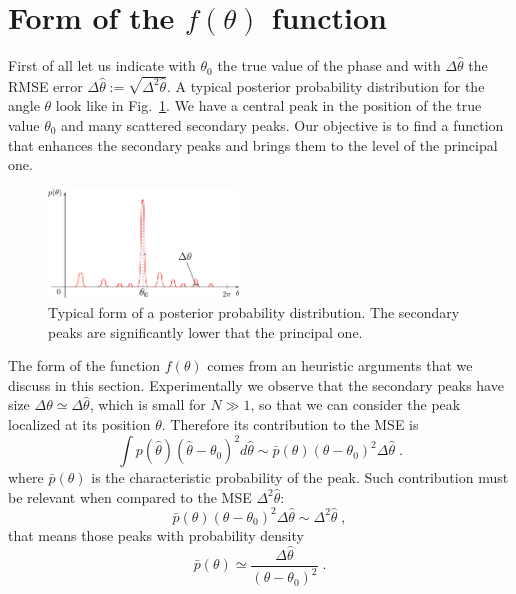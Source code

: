 \documentclass[aps, pra, 10pt, twocolumn, superscriptaddress,floatfix]{revtex4-1}
\begin{document}
\section{Form of the $f(\theta)$ function}
%
First of all let us indicate with $\theta_0$ the true value of the phase and with $\Delta \hat{\theta}$ the RMSE error $\Delta \hat{\theta} := \sqrt{\Delta^2 \hat{\theta}}$. A typical posterior probability distribution for the angle $\theta$ look like in Fig.~\ref{fig:typicalModified}. We have a central peak in the position of the true value $\theta_0$ and many scattered secondary peaks. Our objective is to find a function that enhances the secondary peaks and brings them to the level of the principal one.
%
\begin{figure}[!t]
	\begin{center}
		\includegraphics[width=0.45\textwidth]{immagini/typical.pdf}
	\end{center}
	\caption{Typical form of a posterior probability distribution. The secondary peaks are significantly lower that the principal one.}
	\label{fig:typicalModified}
\end{figure}
%
The form of the function $f(\theta)$ comes from an heuristic arguments that we discuss in this section. Experimentally we observe that the secondary peaks have size $\Delta \theta \simeq \Delta \hat{\theta}$, which is small for $N \gg 1$, so that we can consider the peak localized at its position $\theta$. Therefore its contribution to the MSE is
%
\begin{equation}
	\int p(\hat{\theta}) (\hat{\theta}-\theta_0)^2 d \hat{\theta} \sim \bar{p}(\theta) (\theta-\theta_0)^2 \Delta \hat{\theta} \; .
\end{equation}
% 
where $\bar{p}(\theta)$ is the characteristic probability of the peak. Such contribution must be relevant when compared to the MSE $\Delta^2 \hat{\theta}$:
%
\begin{equation}
	\bar{p}(\theta) (\theta-\theta_0)^2 \Delta \hat{\theta} \sim \Delta^2 \hat{\theta} \; ,
\end{equation}
%
that means those peaks with probability density 
%
\begin{equation}
	\bar{p}(\theta) \simeq \frac{\Delta \hat{\theta}}{(\theta-\theta_0)^2} \; .
\end{equation}
\end{document}
